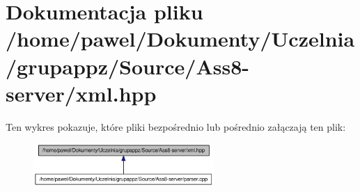\hypertarget{a00011}{
\section{Dokumentacja pliku /home/pawel/Dokumenty/Uczelnia/grupappz/Source/Ass8-server/xml.hpp}
\label{a00011}
}


Ten wykres pokazuje, które pliki bezpośrednio lub pośrednio załączają ten plik:\nopagebreak
\begin{figure}[H]
\begin{center}
\leavevmode
\includegraphics[width=194pt]{a00033}
\end{center}
\end{figure}
